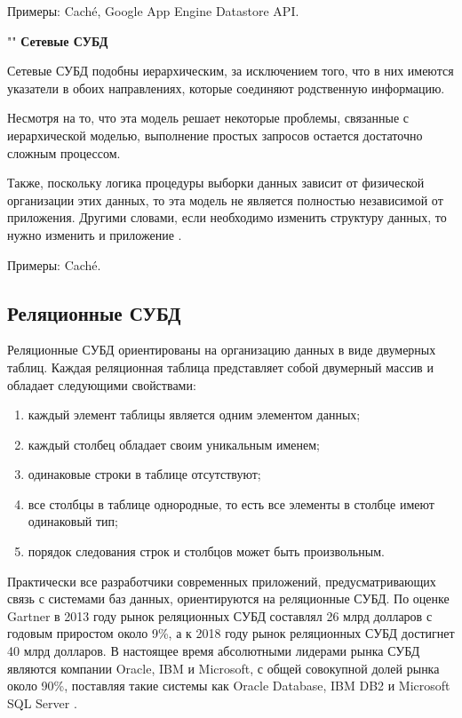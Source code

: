 \documentclass{bmstu}
\begin{document}
Примеры: Caché, Google App Engine Datastore API.

""\newline
\noindent\textbf{Сетевые СУБД}

Сетевые СУБД подобны иерархическим, за исключением того, что в них имеются указатели в обоих направлениях, которые соединяют родственную информацию.

Несмотря на то, что эта модель решает некоторые проблемы, связанные с иерархической моделью, выполнение простых запросов остается достаточно сложным процессом.

Также, поскольку логика процедуры выборки данных зависит от физической организации этих данных, то эта модель не является полностью независимой от приложения. Другими словами, если необходимо изменить структуру данных, то нужно изменить и приложение \cite{scienceforum}.

Примеры: Caché.

\subsection*{Реляционные СУБД}

Реляционные СУБД ориентированы на организацию данных в виде двумерных таблиц. Каждая реляционная таблица представляет собой двумерный массив и обладает следующими свойствами:

\begin{enumerate}
	\setlength\itemsep{0.01em}
	\item каждый элемент таблицы является одним элементом данных;
	\item каждый столбец обладает своим уникальным именем;
	\item одинаковые строки в таблице отсутствуют;
	\item все столбцы в таблице однородные, то есть все элементы в столбце имеют одинаковый тип;
	\item порядок следования строк и столбцов может быть произвольным.
\end{enumerate}

Практически все разработчики современных приложений, предусматривающих связь с системами баз данных, ориентируются на реляционные СУБД. По оценке Gartner в 2013 году рынок реляционных СУБД составлял 26 млрд долларов с годовым приростом около 9\%, а к 2018 году рынок реляционных СУБД достигнет 40 млрд долларов. В настоящее время абсолютными лидерами рынка СУБД являются компании Oracle, IBM и Microsoft, с общей совокупной долей рынка около 90\%, поставляя такие системы как Oracle Database, IBM DB2 и Microsoft SQL Server \cite{dbms}.
\end{document}
